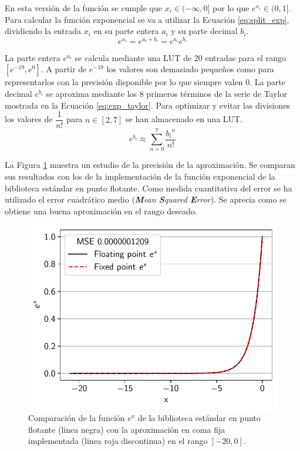 En esta versión de la función se cumple que $x_i \in (-\infty, 0]$ por lo que $e^{x_i} \in (0,1]$. Para calcular la función exponencial se va a utilizar la Ecuación \ref{eq:split_exp}, dividiendo la entrada $x_i$ en su parte entera $a_i$ y su parte decimal $b_i$.
\begin{equation} \label{eq:split_exp}
e^{x_i} = e^{a_i+b_i} = e^{a_i} e^{b_i}
\end{equation}

La parte entera $e^{a_i}$ se calcula mediante una LUT de 20 entradas para el rango $[e^{-19}, e^{0}]$. A partir de $e^{-19}$ los valores son demasiado pequeños como para representarlos con la precisión disponible por lo que siempre valen $0$. La parte decimal $e^{b_i}$ se aproxima mediante los 8 primeros términos de la serie de Taylor mostrada en la Ecuación \ref{eq:exp_taylor}. Para optimizar y evitar las divisiones los valores de $\dfrac{1}{n!}$ para $n \in [2,7]$ se han almacenado en una LUT.
\begin{equation} \label{eq:exp_taylor}
e^{b_i} \approx \sum_{n=0}^{7} \dfrac{{b_i}^n}{n!}
\end{equation}

La Figura \ref{fig:exp_aprox} muestra un estudio de la precisión de la aproximación. Se comparan sus resultados con los de la implementación de la función exponencial de la biblioteca estándar en punto flotante. Como medida cuantitativa del error se ha utilizado el error cuadrático medio (\textit{\textbf{M}ean \textbf{S}quared \textbf{E}rror}). Se aprecia como se obtiene una buena aproximación en el rango deseado.

\begin{figure}[h]
    \centering
    \includegraphics[width=0.55\linewidth]{root/Imagenes/4_bnn_riscv/exp_aprox.pdf}
    \caption{Comparación de la función $e^x$ de la biblioteca estándar en punto flotante (linea negra) con la aproximación en coma fija implementada (linea roja discontinua) en el rango $[-20,0]$.}
    \label{fig:exp_aprox}
\end{figure}

